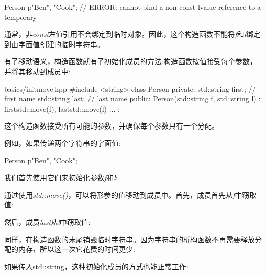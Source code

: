 \begin{codebox}[cpp]
Person p{"Ben", "Cook"}; // ERROR: cannot bind a non-const lvalue reference to a temporary
\end{codebox}

通常，非\textit{const}左值引用不会绑定到临时对象。因此，这个构造函数不能将\textit{f}和\textit{l}绑定到由字面值创建的临时字符串。\par


有了移动语义，构造函数就有了初始化成员的方法:构造函数按值接受每个参数，并将其移动到成员中:\par

\begin{codeboxt}[cpp]{basics/initmove.hpp}
#include <string>
class Person {
private:
  std::string first; // first name
  std::string last; // last name
public:
  Person(std::string f, std::string l)
  : first{std::move(f)}, last{std::move(l)} {
  }
  ...
};
\end{codeboxt}

这个构造函数接受所有可能的参数，并确保每个参数只有一个分配。\par

例如，如果传递两个字符串的字面值:\par

\begin{codebox}[cpp]
Person p{"Ben", "Cook"};
\end{codebox}

我们首先使用它们来初始化参数\textit{f}和\textit{l}:\par


通过使用\textit{std::move()}，可以将形参的值移动到成员中。首先，成员首先从\textit{f}中窃取值:\par


然后，成员\textit{last}从\textit{l}中窃取值:\par


同样，在构造函数的末尾销毁临时字符串。因为字符串的析构函数不再需要释放分配的内存，所以这一次它花费的时间更少:\par


如果传入std::string，这种初始化成员的方式也能正常工作:\par

